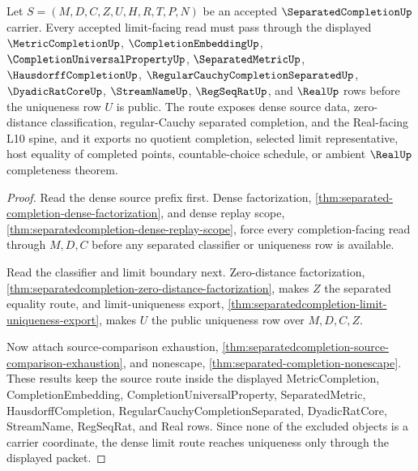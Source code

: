 \begin{theorem}
\label{thm:separatedcompletion-dense-limit-route}
Let $S=(M,D,C,Z,U,H,R,T,P,N)$ be an accepted $\SeparatedCompletionUp$ carrier. Every accepted limit-facing read must pass through the displayed $\MetricCompletionUp$, $\CompletionEmbeddingUp$, $\CompletionUniversalPropertyUp$, $\SeparatedMetricUp$, $\HausdorffCompletionUp$, $\RegularCauchyCompletionSeparatedUp$, $\DyadicRatCoreUp$, $\StreamNameUp$, $\RegSeqRatUp$, and $\RealUp$ rows before the uniqueness row $U$ is public. The route exposes dense source data, zero-distance classification, regular-Cauchy separated completion, and the Real-facing L10 spine, and it exports no quotient completion, selected limit representative, host equality of completed points, countable-choice schedule, or ambient $\RealUp$ completeness theorem.
\end{theorem}
\begin{proof}
Read the dense source prefix first. Dense factorization, \autoref{thm:separated-completion-dense-factorization}, and dense replay scope, \autoref{thm:separatedcompletion-dense-replay-scope}, force every completion-facing read through $M,D,C$ before any separated classifier or uniqueness row is available.

Read the classifier and limit boundary next. Zero-distance factorization, \autoref{thm:separatedcompletion-zero-distance-factorization}, makes $Z$ the separated equality route, and limit-uniqueness export, \autoref{thm:separatedcompletion-limit-uniqueness-export}, makes $U$ the public uniqueness row over $M,D,C,Z$.

Now attach source-comparison exhaustion, \autoref{thm:separatedcompletion-source-comparison-exhaustion}, and nonescape, \autoref{thm:separated-completion-nonescape}. These results keep the source route inside the displayed MetricCompletion, CompletionEmbedding, CompletionUniversalProperty, SeparatedMetric, HausdorffCompletion, RegularCauchyCompletionSeparated, DyadicRatCore, StreamName, RegSeqRat, and Real rows. Since none of the excluded objects is a carrier coordinate, the dense limit route reaches uniqueness only through the displayed packet.
\end{proof}


